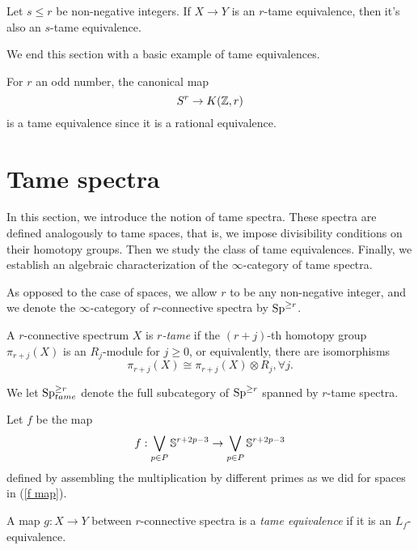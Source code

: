 \begin{remark}
	Let $s\leq r$ be non-negative integers.
	If $X\to Y$ is an $r$-tame equivalence, then it's also an $s$-tame equivalence.
\end{remark}

We end this section with a basic example of tame equivalences.
\begin{example}
\label{odd sphere is tame equivalent to EM-space}
For $r$ an odd number,
the canonical map 
$$
S^r \to K({\mathbb{Z}}, r)
$$
is a tame equivalence since it is a rational equivalence.
\end{example}

\section{Tame spectra}
\label{Section: Tame spectra}

In this section, we introduce the notion of tame spectra.
These spectra are defined analogously to tame spaces, that is, we impose divisibility conditions on their homotopy groups.
Then we study the class of tame equivalences.
Finally, we establish an algebraic characterization of the $\infty$-category of tame spectra.

As opposed to the case of spaces, we allow $r$ to be any non-negative integer, and we denote the $\infty$-category of $r$-connective spectra by $\operatorname{Sp}^{\geq r}$.

\begin{definition}
	A $r$-connective spectrum $X$ is \emph{$r$-tame} if the $(r+j)$-th homotopy group $\pi_{r+j}(X)$ is an $R_j$-module for $j\geq 0$, or equivalently, there are isomorphisms
	\[
	\pi_{r+j}(X)\cong \pi_{r+j}(X)\otimes R_{j}, \forall j.
	\]
\end{definition}

\begin{notation}
We let $\operatorname{Sp}^{\geq r}_{tame}$ denote the full subcategory of $\operatorname{Sp}^{\geq r}$ spanned by $r$-tame spectra.
\end{notation}


Let $f$ be the map 
\begin{equation}
\label{f for spectra}
	f: \bigvee_{p\in P}{\mathbb{S}}^{r+2p-3} \to \bigvee_{p\in P}{\mathbb{S}}^{r+2p-3}
\end{equation}
defined by assembling the multiplication by different primes as we did for spaces in (\ref{f map}).
\begin{definition}
    A map $g:X \to Y$ between $r$-connective spectra is a \emph{tame equivalence} if it is an $L_f$-equivalence.
\end{definition}

